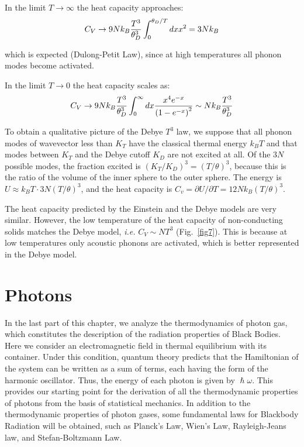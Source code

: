 \documentclass[book.tex]{subfiles}
\begin{document}
In the limit $T \rightarrow \infty $ the heat capacity approaches:
\begin{equation}
C_V \rightarrow 9Nk_B\frac{T^3}{\theta_D^3}\int_0^{\theta_D/T}dxx^2 = 3Nk_B \notag
\end{equation}

\noindent which is expected (Dulong-Petit Law), since at high temperatures all phonon modes become activated.

In the limit $T \rightarrow 0 $ the heat capacity scales as:
\begin{align}
C_V \rightarrow 9Nk_B\frac{T^3}{\theta_D^3}\int_0^{\infty}dx\frac{x^4e^{-x}}{\left(1-e^{-x}\right)^2} \sim Nk_B\frac{T^3}{\theta_D^3} \notag
\end{align}

To obtain a qualitative picture of the Debye $T^3$ law, we suppose that all phonon modes of wavevector less than $K_T$ have the classical thermal energy
$k_BT$ and that modes between $K_T$ and the Debye cutoff $K_D$ are not excited at all. Of the $3N$ possible modes, the fraction excited is 
$(K_T/K_D)^3=(T/\theta)^3$, because this is the ratio of the volume of the inner sphere to the outer sphere. The energy is $U \approx k_BT \cdot 3N(T/\theta)^3$,
and the heat capacity is $C_v=\partial U/\partial T = 12Nk_B(T/\theta)^3$.


The heat capacity predicted by the Einstein and the Debye models are very similar. However, the low temperature of the heat capacity of non-conducting solids matches the Debye model, \textit{i.e.} $C_V \sim NT^3$ (Fig.~\ref{fig7}). This is because at low temperatures only acoustic phonons are activated, which is better represented in the Debye model.

\section{Photons}
In the last part of this chapter, we analyze the thermodynamics of photon gas, which constitutes the description of the radiation properties of Black Bodies. Here we consider an electromagnetic field in thermal equilibrium with its container. Under this condition, quantum theory predicts that the Hamiltonian of the system can be written as a sum of terms, each having the form of the harmonic oscillator. Thus, the energy of each photon is given by $\hslash\omega$. This provides our starting point for the derivation of all the thermodynamic properties of photons from the basis of statistical mechanics. In addition to the thermodynamic properties of photon gases, some fundamental laws for Blackbody Radiation will be obtained, such as Planck's Law, Wien's Law, Rayleigh-Jeans law, and Stefan-Boltzmann Law.
\end{document}
